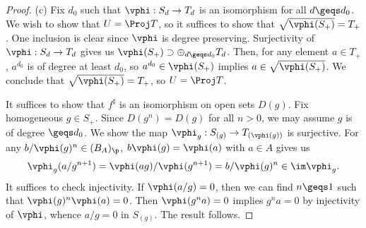 \documentclass[12pt]{amsart}
\begin{document}
\begin{proof}
  (c) Fix $d_0$ such that $\vphi:S_d\to T_d$ is an isomorphism for all $d\geqs d_0$.
  We wish to show that $U=\Proj T$, so it suffices to show that $\sqrt{\vphi(S_+)}=T_+$.
  One inclusion is clear since $\vphi$ is degree preserving.
  Surjectivity of $\vphi:S_d\to T_d$ gives us $\vphi(S_+)\supset \oplus_{d\geqs d_0}T_d$.
  Then, for any element $a\in T_+$, $a^{d_0}$ is of degree at least $d_0$, so $a^{d_0}\in \vphi(S_+)$ implies $a\in \sqrt{\vphi(S_+)}$.
  We conclude that $\sqrt{\vphi(S_+)}=T_+$, so $U=\Proj T$.



  It suffices to show that $f^\sharp$ is an isomorphism on open sets $D(g)$.
  Fix homogeneous $g\in S_+$.
  Since $D(g^n)=D(g)$ for all $n>0$, we may assume $g$ is of degree $\geqs d_0$.
  We show the map $\vphi_g:S_{(g)}\to T_{(\vphi(g))}$ is surjective.
  For any $b/\vphi(g)^n\in (B_A)_\p$, $b\vphi(g)=\vphi(a)$ with $a\in A$ gives us 
  \[
    \vphi_g(a/g^{n+1})=\vphi(ag)/\vphi(g^{n+1})=b/\vphi(g)^n\in \im\vphi_g.
  \]
  It suffices to check injectivity.
  If $\vphi(a/g)=0$, then we can find $n\geqs 1$ such that $\vphi(g)^n\vphi(a)=0$.
  Then $\vphi(g^na)=0$ implies $g^na=0$ by injectivity of $\vphi$, whence $a/g =0$ in $S_{(g)}$.
  The result follows.
\end{proof}
\end{document}
